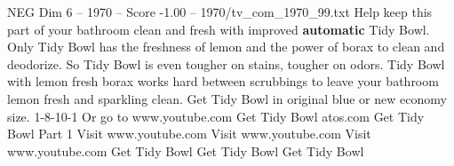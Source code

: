 \begin{textsample}{NEG Dim 6 – 1970 – Score -1.00 – 1970/tv\_com\_1970\_99.txt}  \label{ex:f6_neg_066}
Help keep this part of your bathroom clean and fresh with improved \textbf{automatic} Tidy Bowl.
Only Tidy Bowl has the freshness of lemon and the power of borax to clean and deodorize.
So Tidy Bowl is even tougher on stains, tougher on odors.
Tidy Bowl with lemon fresh borax works hard between scrubbings to leave your bathroom lemon fresh and sparkling clean.
Get Tidy Bowl in original blue or new economy size. 1-8-10-1 Or go to www.youtube.com Get Tidy Bowl atos.com Get Tidy Bowl Part 1 Visit www.youtube.com Visit www.youtube.com Visit www.youtube.com Get Tidy Bowl Get Tidy Bowl Get Tidy Bowl

\end{textsample}
